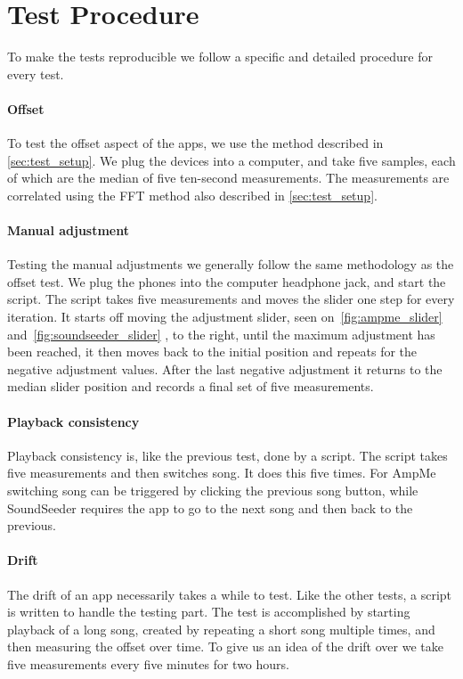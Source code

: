 \section{Test Procedure}\label{sec:test_procedure}
To make the tests reproducible we follow a specific and detailed
procedure for every test.

\paragraph{Offset}
To test the offset aspect of the apps, we use the method described in
\cref{sec:test_setup}. We plug the devices into a computer, and take
five samples, each of which are the median of five ten-second measurements. The
measurements are correlated using the \ac{FFT} method also described in
\cref{sec:test_setup}.

\paragraph{Manual adjustment}
Testing the manual adjustments we generally follow the same methodology as
the offset test. We plug the phones into the computer headphone jack,
and start the script. The script takes five measurements and moves the
slider one step for every iteration. It starts off moving the adjustment
slider, seen on~\vref{fig:ampme_slider} and~\vref{fig:soundseeder_slider}
, to the right, until the maximum adjustment has
been reached, it then moves back to the initial position and repeats for
the negative adjustment values. After the last negative adjustment it
returns to the median slider position and records a final set of
five measurements.

\paragraph{Playback consistency}
Playback consistency is, like the previous test, done by a script. The
script takes five measurements and then switches song. It does this
five times. For AmpMe switching song can be triggered by clicking the
previous song button, while SoundSeeder requires the app to go to the
next song and then back to the previous.

\paragraph{Drift}
The drift of an app necessarily takes a while to test. Like the other
tests, a script is written to handle the testing part. The test is
accomplished by starting playback of a long song, created by repeating
a short song multiple times, and then measuring the offset over time. To
give us an idea of the drift over we take five measurements every five minutes
for two hours.
